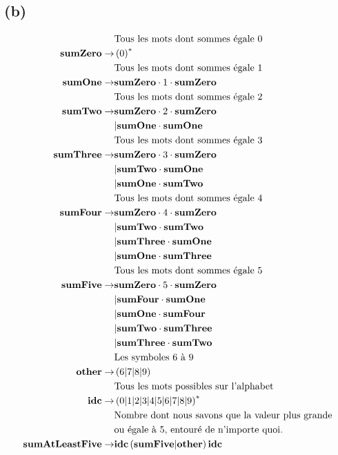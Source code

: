 \documentclass[class=article]{standalone}
\begin{document}
\subsection*{(b)}
\begin{align*}
    &\text{Tous les mots dont sommes égale 0}\\
    {\bf{sumZero}} \rightarrow&
        \left ( 0 \right )^*\\
    &\text{Tous les mots dont sommes égale 1}\\
    {\bf{sumOne}} \rightarrow&
        {\bf{sumZero}}\cdot 1 \cdot{\bf{sumZero}}\\
    &\text{Tous les mots dont sommes égale 2}\\
    {\bf{sumTwo}} \rightarrow&
        {\bf{sumZero}}\cdot 2 \cdot{\bf{sumZero}}\\&
        |{\bf{sumOne}}\cdot{\bf{sumOne}} \\
    &\text{Tous les mots dont sommes égale 3}\\
    {\bf{sumThree}} \rightarrow&
        {\bf{sumZero}}\cdot 3 \cdot{\bf{sumZero}}\\&
        |{\bf{sumTwo}}\cdot{\bf{sumOne}}\\&
        |{\bf{sumOne}}\cdot{\bf{sumTwo}} \\
    &\text{Tous les mots dont sommes égale 4}\\
    {\bf{sumFour}} \rightarrow& 
        {\bf{sumZero}}\cdot 4 \cdot{\bf{sumZero}} \\&
        |{\bf{sumTwo}}\cdot{\bf{sumTwo}}\\&
        |{\bf{sumThree}}\cdot{\bf{sumOne}}\\&
        |{\bf{sumOne}}\cdot{\bf{sumThree}}\\
    &\text{Tous les mots dont sommes égale 5}\\
    {\bf{sumFive}} \rightarrow& 
        {\bf{sumZero}}\cdot 5 \cdot{\bf{sumZero}} \\&
        |{\bf{sumFour}}\cdot {\bf{sumOne}}\\&
        |{\bf{sumOne}}\cdot {\bf{sumFour}}\\&
        |{\bf{sumTwo}}\cdot {\bf{sumThree}}\\&
        |{\bf{sumThree}}\cdot {\bf{sumTwo}}\\
    &\text{Les symboles 6 à 9 }\\
    {\bf{other}} \rightarrow& 
        \left ( 6|7|8|9 \right )\\
    &\text{Tous les mots possibles sur l'alphabet}\\
    {\bf{idc}} \rightarrow& 
        \left ( 0|1|2|3|4|5|6|7|8|9 \right )^*\\
    &\text{Nombre dont nous savons que la valeur plus grande}\\
    &\text{ou égale à 5, entouré de n'importe quoi.}\\
    {\bf{sumAtLeastFive}} \rightarrow& 
        {\bf{idc}}\left ( {\bf{sumFive}}|{\bf{other}} \right ){\bf{idc}}\\&
\end{align*}
\end{document}
